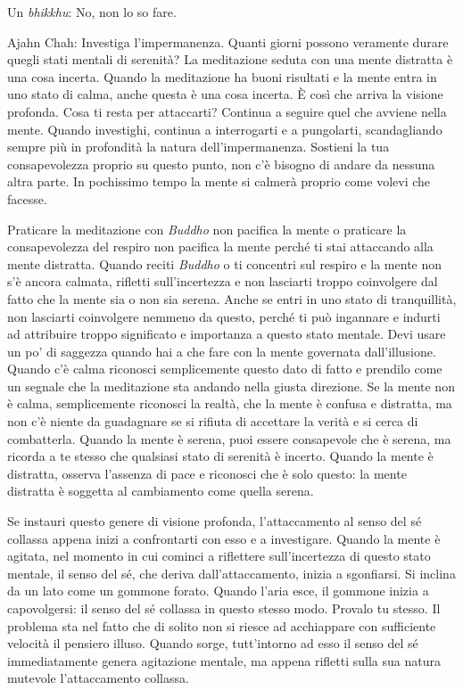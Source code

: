 Un \emph{bhikkhu}: No, non lo so fare.

Ajahn Chah: Investiga l'impermanenza. Quanti giorni possono veramente
durare quegli stati mentali di serenità? La meditazione seduta con una
mente distratta è una cosa incerta. Quando la meditazione ha buoni
risultati e la mente entra in uno stato di calma, anche questa è una
cosa incerta. È così che arriva la visione profonda. Cosa ti resta per
attaccarti? Continua a seguire quel che avviene nella mente. Quando
investighi, continua a interrogarti e a pungolarti, scandagliando sempre
più in profondità la natura dell'impermanenza. Sostieni la tua
consapevolezza proprio su questo punto, non c'è bisogno di andare da
nessuna altra parte. In pochissimo tempo la mente si calmerà proprio
come volevi che facesse.

Praticare la meditazione con \emph{Buddho} non pacifica la mente o
praticare la consapevolezza del respiro non pacifica la mente perché ti
stai attaccando alla mente distratta. Quando reciti \emph{Buddho} o ti
concentri sul respiro e la mente non s'è ancora calmata, rifletti
sull'incertezza e non lasciarti troppo coinvolgere dal fatto che la
mente sia o non sia serena. Anche se entri in uno stato di tranquillità,
non lasciarti coinvolgere nemmeno da questo, perché ti può ingannare e
indurti ad attribuire troppo significato e importanza a questo stato
mentale. Devi usare un po' di saggezza quando hai a che fare con la
mente governata dall'illusione. Quando c'è calma riconosci semplicemente
questo dato di fatto e prendilo come un segnale che la meditazione sta
andando nella giusta direzione. Se la mente non è calma, semplicemente
riconosci la realtà, che la mente è confusa e distratta, ma non c'è
niente da guadagnare se si rifiuta di accettare la verità e si cerca di
combatterla. Quando la mente è serena, puoi essere consapevole che è
serena, ma ricorda a te stesso che qualsiasi stato di serenità è
incerto. Quando la mente è distratta, osserva l'assenza di pace e
riconosci che è solo questo: la mente distratta è soggetta al
cambiamento come quella serena.

Se instauri questo genere di visione profonda, l'attaccamento al senso
del sé collassa appena inizi a confrontarti con esso e a investigare.
Quando la mente è agitata, nel momento in cui cominci a riflettere
sull'incertezza di questo stato mentale, il senso del sé, che deriva
dall'attaccamento, inizia a sgonfiarsi. Si inclina da un lato come un
gommone forato. Quando l'aria esce, il gommone inizia a capovolgersi: il
senso del sé collassa in questo stesso modo. Provalo tu stesso. Il
problema sta nel fatto che di solito non si riesce ad acchiappare con
sufficiente velocità il pensiero illuso. Quando sorge, tutt'intorno ad
esso il senso del sé immediatamente genera agitazione mentale, ma appena
rifletti sulla sua natura mutevole l'attaccamento collassa.

